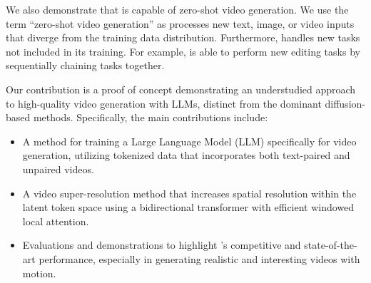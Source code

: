 We also demonstrate that \modelname{} is capable of zero-shot video generation. We use the term ``zero-shot video generation'' as \modelname{} processes new text, image, or video inputs that diverge from the training data distribution.
%
Furthermore, \modelname{} handles new tasks not included in its training. For example, \modelname{} is able to perform new editing tasks by sequentially chaining tasks together. %

Our contribution is a proof of concept demonstrating an understudied approach to high-quality video generation with LLMs, distinct from the dominant diffusion-based methods.
%
Specifically, the main contributions include:
\begin{itemize}[nosep, leftmargin=*]
    \item A method for training a Large Language Model (LLM) specifically for video generation, utilizing tokenized data that incorporates both text-paired and unpaired videos.
    \item A video super-resolution method that increases spatial resolution within the latent token space using a bidirectional transformer with efficient windowed local attention.
    \item Evaluations and demonstrations to highlight  \modelname{}'s competitive and state-of-the-art performance, especially in generating realistic and interesting videos with motion.
\end{itemize}
